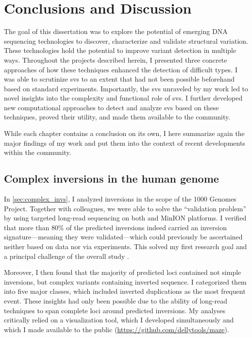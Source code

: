 \chapter{Conclusions and Discussion}
\label{sec:conclusions}

The goal of this dissertation was to explore the potential of emerging DNA
sequencing technologies to discover, characterize and validate structural
variation. These technologies hold the potential to improve variant detection in
multiple ways. Throughout the projects described herein, I presented three
concrete approaches of how these techniques enhanced the detection of difficult
\sv types. I was able to scrutinize \acp{sv} to an extent that had not been
possible beforehand based on standard \mps experiments. Importantly, the
\acp{sv} unraveled by my work led to novel insights into the complexity and
functional role
of \acp{sv}. I further developed new computational approaches to detect and
analyze \acp{sv} based on these techniques, proved their utility, and made
them available to the community.

While each chapter contains a conclusion on its own, I here summarize again the
major findings of my work and put them into the context of recent developments
within the community.



\section{Complex inversions in the human genome}

In \cref{sec:complex_invs}, I analyzed inversions in the scope of the 1000
Genomes Project. Together with colleagues, we were able to solve the
``validation problem'' by using targeted long-read sequencing on both \pacbio
and \ont MinION platforms. I verified that more than 80\% of the predicted
inversions indeed carried an inversion signature---meaning they were
validated---which could previously be ascertained neither based on \mps data nor
via \pcr experiments. This solved my first research goal and a principal
challenge of the overall study \citep{Sudmant2015}.

Moreover, I then found that
the majority of predicted loci contained not simple inversions, but complex
variants containing inverted sequence. I categorized them into five major
classes, which included inverted duplications as the most frequent event. These
insights had only been possible due to the ability of long-read techniques to
span complete loci around predicted inversions. My analyses critically relied on
a visualization tool, which I developed simultaneously and which I made
available to the public (\url{https://github.com/dellytools/maze}).


